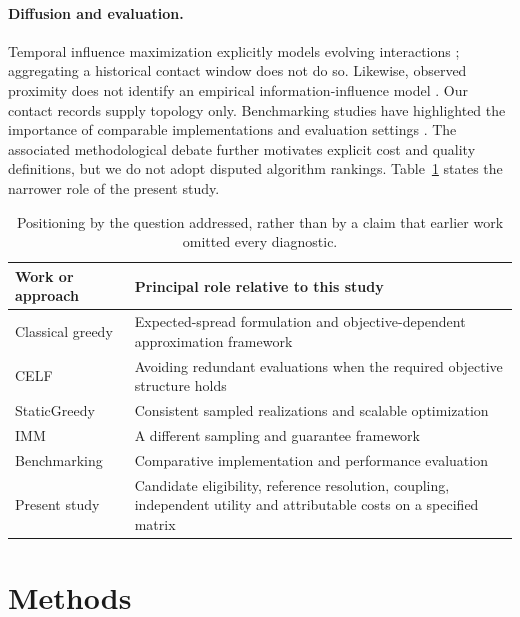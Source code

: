 \paragraph{Diffusion and evaluation.}
Temporal influence maximization explicitly models evolving interactions \cite{ref11}; aggregating a historical contact window does not do so. Likewise, observed proximity does not identify an empirical information-influence model \cite{ref15}. Our contact records supply topology only. Benchmarking studies have highlighted the importance of comparable implementations and evaluation settings \cite{ref16}. The associated methodological debate further motivates explicit cost and quality definitions, but we do not adopt disputed algorithm rankings. Table~\ref{tab:position} states the narrower role of the present study.

\begin{table}[t]
\caption{Positioning by the question addressed, rather than by a claim that earlier work omitted every diagnostic.}\label{tab:position}
\begin{tabularx}{\linewidth}{lX}
\toprule
Work or approach & Principal role relative to this study \\
\midrule
Classical greedy \cite{ref1} & Expected-spread formulation and objective-dependent approximation framework \\
CELF \cite{ref7} & Avoiding redundant evaluations when the required objective structure holds \\
StaticGreedy \cite{ref8} & Consistent sampled realizations and scalable optimization \\
IMM \cite{ref2} & A different sampling and guarantee framework \\
Benchmarking \cite{ref16} & Comparative implementation and performance evaluation \\
Present study & Candidate eligibility, reference resolution, coupling, independent utility and attributable costs on a specified matrix \\
\bottomrule
\end{tabularx}
\end{table}

\section{Methods}
